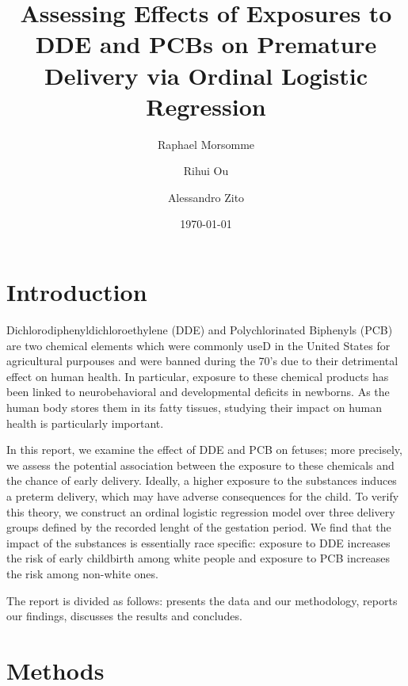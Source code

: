 \documentclass[wcp]{jmlr}%
\title[DDE and PCB effect on Premature delivery]{Assessing Effects of Exposures to DDE and PCBs on Premature Delivery via Ordinal Logistic Regression}	%
\author[Morsomme, Ou, Zito]{Raphael Morsomme \and Rihui Ou \and Alessandro Zito}
\date{\today} %
\begin{document}
\maketitle

\begin{abstract}

\cite{Li_Long_Duns}
\end{abstract}
\newpage
\section{Introduction}
\label{sec:intro}

Dichlorodiphenyldichloroethylene (DDE) and Polychlorinated Biphenyls (PCB) are two chemical elements which were commonly useD in the United States for agricultural purpouses and were banned during the 70's due to their detrimental effect on human health. In particular, exposure to these chemical products has been linked to neurobehavioral and developmental deficits in newborns. As the human body stores them in its fatty tissues, studying their impact on human health is particularly important.

In this report, we examine the effect of DDE and PCB on fetuses; more precisely, we assess the potential association between the exposure to these chemicals and the chance of early delivery. Ideally, a higher exposure to the substances induces a preterm delivery, which may have adverse consequences for the child. To verify this theory, we construct an ordinal logistic regression model over three delivery groups defined by the recorded lenght of the gestation period.  We find that the impact of the substances is essentially race specific: exposure to DDE increases the risk of early childbirth among white people and exposure to PCB increases the risk among non-white ones. 

The report is divided as follows:  presents the data and our methodology,   reports our findings,  discusses the results and concludes.


\section{Methods}
\label{sec:method}
\end{document}
